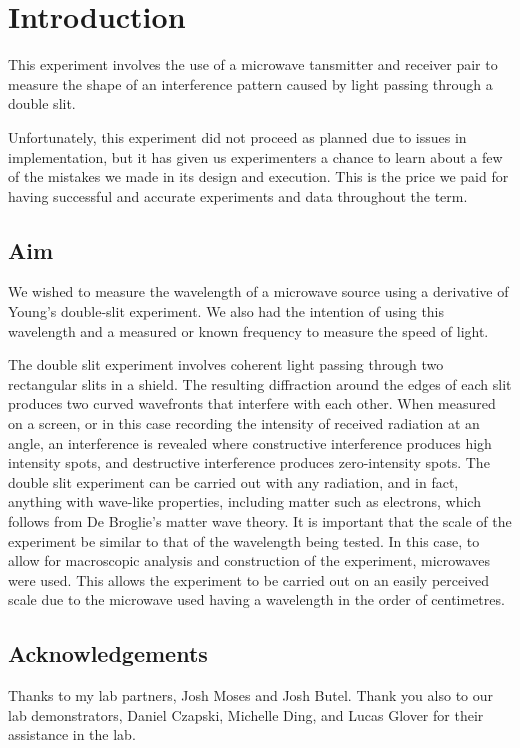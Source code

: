 \section*{Introduction}

This experiment involves the use of a microwave tansmitter and receiver pair to measure the shape of an interference pattern caused by light passing through a double slit.

Unfortunately, this experiment did not proceed as planned due to issues in implementation, but it has given us experimenters a chance to learn about a few of the mistakes we made in its design and execution. This is the price we paid for having successful and accurate experiments and data throughout the term.

\subsection*{Aim}

We wished to measure the wavelength of a microwave source using a derivative of Young's double-slit experiment.
We also had the intention of using this wavelength and a measured or known frequency to measure the speed of light.

The double slit experiment involves coherent light passing through two rectangular slits in a shield. The resulting diffraction around the edges of each slit produces two curved wavefronts that interfere with each other. When measured on a screen, or in this case recording the intensity of received radiation at an angle, an interference is revealed where constructive interference produces high intensity spots, and destructive interference produces zero-intensity spots. The double slit experiment can be carried out with any radiation, and in fact, anything with wave-like properties, including matter such as electrons, which follows from De Broglie's matter wave theory. It is important that the scale of the experiment be similar to that of the wavelength being tested. In this case, to allow for macroscopic analysis and construction of the experiment, microwaves were used. This allows the experiment to be carried out on an easily perceived scale due to the microwave used having a wavelength in the order of centimetres.

\subsection*{Acknowledgements}

Thanks to my lab partners, Josh Moses and Josh Butel. Thank you also to our lab demonstrators, Daniel Czapski, Michelle Ding, and Lucas Glover for their assistance in the lab. 



